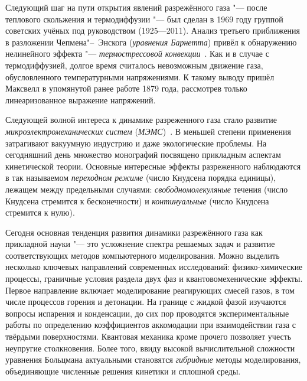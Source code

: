 \documentclass[a4paper, 12pt, oneside]{article} %
\begin{document}
Следующий шаг на пути открытия явлений разрежённого газа "---
после теплового скольжения и термодиффузии "--- был сделан в 1969 году
группой советских учёных под руководством 
(1925---2011). Анализ третьего приближения в разложении
Чепмена"--~Энскога (\emph{уравнения Барнетта}) привёл к обнаружению
нелинейного эффекта "--- \emph{термострессовой
конвекции}~\cite{kogan1976stresses}. Как и в случае с термодиффузией,
долгое время считалось невозможным движение газа, обусловленного
температурными напряжениями. К такому выводу пришёл Максвелл в
упомянутой ранее работе 1879 года, рассмотрев только линеаризованное
выражение напряжений.

Следующей волной интереса к динамике разреженного газа стало развитие
\emph{микроэлектромеханических систем}
(\emph{МЭМС})~\cite{karniadakis2006microflows}. В меньшей степени
применения затрагивают вакуумную индустрию и даже экологические
проблемы. На сегодняшний день множество монографий посвящено прикладным
аспектам кинетической теории. Основные интересные эффекты разреженного
наблюдаются в так называемом \emph{переходном режиме} (число Кнудсена
порядка единицы), лежащем между предельными случаями:
\emph{свободномолекуляные} течения (число Кнудсена стремится к
бесконечности) и \emph{континуальные} (число Кнудсена стремится к нулю).

Сегодня основная тенденция развития динамики разрежённого газа как
прикладной науки "--- это усложнение спектра решаемых задач и развитие
соответствующих методов компьютерного моделирования. Можно выделить
несколько ключевых направлений современных исследований:
физико-химические процессы, граничные условия раздела двух фаз и
квантовомехенические эффекты. Первое направление включает моделирование
реагирующих смесей газов, в том числе процессов горения и детонации. На
границе с жидкой фазой изучаются вопросы испарения и конденсации, до сих
пор проводятся экспериментальные работы по определению коэффициентов
аккомодации при взаимодействии газа с твёрдыми поверхностями. Квантовая
механика кроме прочего позволяет учесть неупругие столкновения. Более
того, ввиду высокой вычислительной сложности уравнения Больцмана
актуальными становятся \emph{гибридные} методы моделирования,
объединяющие численные решения кинетики и сплошной среды.


\printbibheading
{}

\printbibliography[
	heading=subbibliography,
	title={Первичные источники}]

\newrefsection[second]
\nocite{*}
\printbibliography[
	nottype=mvbook,
	sorting=nty,
	env=plain,				%
	heading=subbibliography,
	title={Вторичные источники}]
\end{document}
